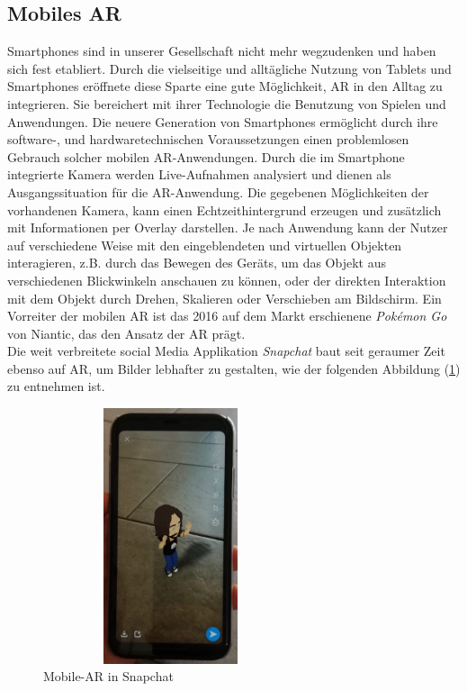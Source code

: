 \subsection{Mobiles AR}
\label{sec:mobilesAR}
Smartphones sind in unserer Gesellschaft nicht mehr wegzudenken und haben sich fest etabliert. Durch die vielseitige und alltägliche Nutzung 
von Tablets und Smartphones eröffnete diese Sparte eine gute Möglichkeit, \acl{AR} in den Alltag zu integrieren. Sie bereichert mit ihrer 
Technologie die Benutzung von Spielen und Anwendungen. Die neuere Generation von Smartphones ermöglicht durch ihre software-, und 
hardwaretechnischen Voraussetzungen einen problemlosen Gebrauch solcher mobilen \acs{AR}-Anwendungen. 
Durch die im Smartphone integrierte Kamera werden Live-Aufnahmen analysiert und dienen als Ausgangssituation für die \acs{AR}-Anwendung. 
Die gegebenen Möglichkeiten der vorhandenen Kamera, kann einen Echtzeithintergrund erzeugen und zusätzlich mit Informationen per Overlay darstellen. 
Je nach Anwendung kann der Nutzer auf verschiedene Weise mit den eingeblendeten und virtuellen Objekten interagieren, z.B. durch das 
Bewegen des Geräts, um das Objekt aus verschiedenen Blickwinkeln anschauen zu können, oder der direkten Interaktion mit dem Objekt durch 
Drehen, Skalieren oder Verschieben am Bildschirm. Ein Vorreiter der mobilen AR ist das 2016 auf dem Markt erschienene \textit{Pokémon Go} 
von Niantic, das den Ansatz der \acs{AR} prägt. \cite{pokemongo.2016a}
\\ 
\linebreak
Die weit verbreitete social Media Applikation \textit{Snapchat} baut seit geraumer Zeit ebenso auf \acl{AR}, um Bilder lebhafter zu 
gestalten, wie der folgenden Abbildung (\ref{pic:snapchatAR}) zu entnehmen ist. 
\begin{figure}[hbt!]
    \centering
    \includegraphics[width=7.5cm,height=7.5cm,keepaspectratio]{2Grundlagen/Bilder/snapchatAR.jpeg}
    \caption{Mobile-AR in Snapchat}
    \label{pic:snapchatAR}
\end{figure}
